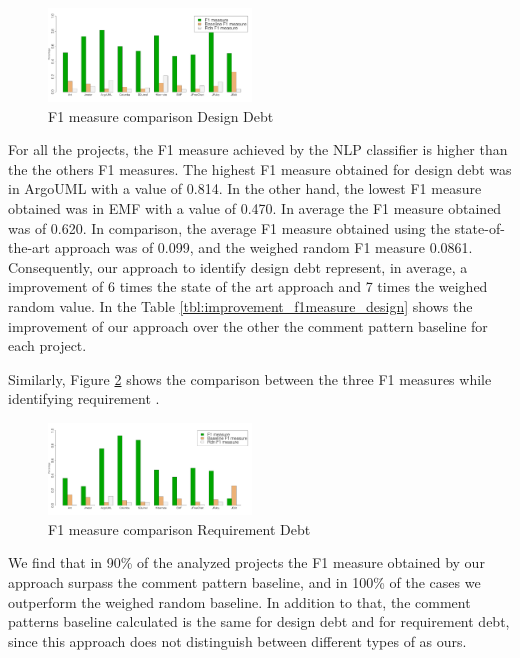 \begin{figure}[thb!]
   \centering
  \includegraphics[width=0.48\textwidth]{figures/f1_measure_comparisom_design_2.pdf}
  \vspace{-3mm}
  \caption{F1 measure comparison Design Debt}
  \label{fig:f1_measure_comparison_design_debt}
\end{figure}

For all the projects, the F1 measure achieved by the NLP classifier is higher than the the others F1 measures. The highest F1 measure obtained for design debt was in ArgoUML with a value of 0.814. In the other hand, the lowest F1 measure obtained was in EMF with a value of 0.470. In average the F1 measure obtained was of 0.620. In comparison, the average F1 measure obtained using the state-of-the-art approach was of 0.099, and the weighed random F1 measure 0.0861. Consequently, our approach to identify design debt represent, in average, a improvement of 6 times the state of the art approach and 7 times the weighed random value. In the  Table \ref{tbl:improvement_f1measure_design} shows the improvement of our approach over the other the comment pattern baseline for each project. 
 
Similarly, Figure \ref{fig:f1_measure_comparison_requeriment} shows the comparison between the three F1 measures while identifying requirement \SATD.

\begin{figure}[thb!]
  \centering
  \includegraphics[width=0.48\textwidth]{figures/f1_measure_comparison_requirement_2.pdf}
  \vspace{-3mm}
  \caption{F1 measure comparison Requirement Debt}
  \label{fig:f1_measure_comparison_requeriment}
\end{figure}

We find that in 90\% of the analyzed projects the F1 measure obtained by our approach surpass the comment pattern baseline, and in 100\% of the cases we outperform the weighed random baseline. In addition to that, the comment patterns baseline calculated is the same for design debt and for requirement debt, since this approach does not distinguish between different types of \SATD as ours. 

